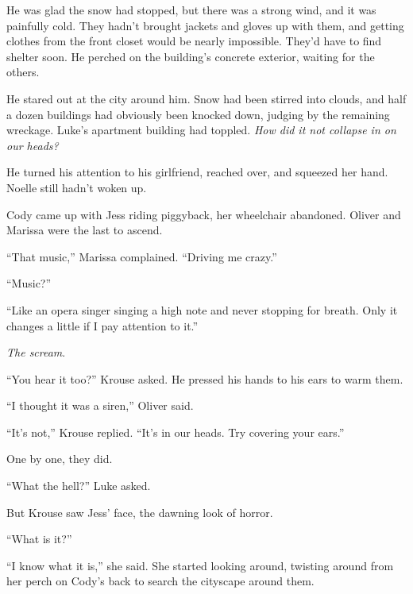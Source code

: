He was glad the snow had stopped, but there was a strong wind, and it was painfully cold.  They hadn't brought jackets and gloves up with them, and getting clothes from the front closet would be nearly impossible.  They'd have to find shelter soon.  He perched on the building's concrete exterior, waiting for the others.



He stared out at the city around him.  Snow had been stirred into clouds, and half a dozen buildings had obviously been knocked down, judging by the remaining wreckage.  Luke's apartment building had toppled.  \emph{How did it not collapse in on our heads?}



He turned his attention to his girlfriend, reached over, and squeezed her hand.  Noelle still hadn't woken up.



Cody came up with Jess riding piggyback, her wheelchair abandoned.  Oliver and Marissa were the last to ascend.



``That music,'' Marissa complained.  ``Driving me crazy.''



``Music?''



``Like an opera singer singing a high note and never stopping for breath.  Only it changes a little if I pay attention to it.''



\emph{The scream}.



``You hear it too?''  Krouse asked.  He pressed his hands to his ears to warm them.



``I thought it was a siren,'' Oliver said.



``It's not,'' Krouse replied.  ``It's in our heads.  Try covering your ears.''



One by one, they did.



``What the hell?''  Luke asked.



But Krouse saw Jess' face, the dawning look of horror.



``What is it?''



``I know what it is,'' she said.  She started looking around, twisting around from her perch on Cody's back to search the cityscape around them.



